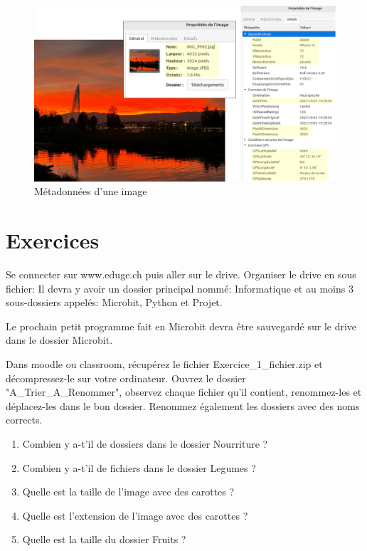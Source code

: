 \documentclass[11pt, a4paper]{book}
\begin{document}
\begin{figure}[h!]
    \centering
    \includegraphics[width=0.75\linewidth]{images/metadata.png}
    \caption{Métadonnées d'une image}
\end{figure}


\section{Exercices}

\begin{exercice}
Se connecter sur www.eduge.ch puis aller sur le drive.
 Organiser le drive en sous fichier: Il devra y avoir un dossier principal nommé: Informatique et au moins 3 sous-dossiers appelés: Microbit, Python et Projet. 
 
 Le prochain petit programme fait en Microbit devra être sauvegardé sur le drive dans le dossier Microbit. 
\end{exercice}


\begin{exercice}
Dans moodle ou classroom, récupérez le fichier Exercice\_1\_fichier.zip et décompressez-le sur votre ordinateur.
Ouvrez le dossier "A\_Trier\_A\_Renommer", observez chaque fichier qu'il contient, renommez-les et déplacez-les dans le bon dossier. Renommez également les dossiers avec des noms corrects.
\begin{enumerate}
    \item Combien y a-t'il de dossiers dans le dossier Nourriture ?
    \item Combien y a-t'il de fichiers dans le dossier Legumes ?
    \item Quelle est la taille de l'image avec des carottes ?
    \item Quelle est l'extension de l'image avec des carottes ?
    \item Quelle est la taille du dossier Fruits ?
\end{enumerate}
\end{exercice}
\end{document}
